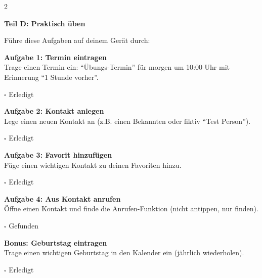 \documentclass[a4paper,landscape,8pt]{extarticle}
\begin{document}
\begin{multicols}{2}
\columnbreak

\textbf{\large Teil D: Praktisch üben}

Führe diese Aufgaben auf deinem Gerät durch:

\vspace{3mm}

\textbf{Aufgabe 1: Termin eintragen}\\
Trage einen Termin ein: ``Übungs-Termin'' für morgen um 10:00 Uhr mit Erinnerung ``1 Stunde vorher''.

\vspace{2mm}
$\square$ Erledigt

\vspace{5mm}

\textbf{Aufgabe 2: Kontakt anlegen}\\
Lege einen neuen Kontakt an (z.B. einen Bekannten oder fiktiv ``Test Person'').

\vspace{2mm}
$\square$ Erledigt

\vspace{5mm}

\textbf{Aufgabe 3: Favorit hinzufügen}\\
Füge einen wichtigen Kontakt zu deinen Favoriten hinzu.

\vspace{2mm}
$\square$ Erledigt

\vspace{5mm}

\textbf{Aufgabe 4: Aus Kontakt anrufen}\\
Öffne einen Kontakt und finde die Anrufen-Funktion (nicht antippen, nur finden).

\vspace{2mm}
$\square$ Gefunden

\vspace{5mm}

\textbf{Bonus: Geburtstag eintragen}\\
Trage einen wichtigen Geburtstag in den Kalender ein (jährlich wiederholen).

\vspace{2mm}
$\square$ Erledigt

\end{multicols}

\newpage

\end{document}
